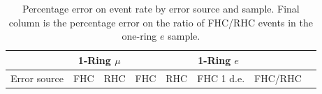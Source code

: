 \begin{table}[H]
	\centering
	\begin{tabular}{|l||l|l||l|l|l|l|l|}
		\hline
		& \multicolumn{2}{c||}{\textbf{1-Ring $\mu$}} & \multicolumn{4}{c|}{\textbf{1-Ring $e$}} \\ \hline
		Error source & FHC & RHC & FHC & RHC & FHC 1 d.e. & FHC/RHC \\ \hline\hline
		
		
		
		
		
		
		
		\hline
		
		
	\end{tabular}
	\caption
	{
	Percentage error on event rate by error source and sample. Final column is the percentage error on the ratio of FHC/RHC events in the one-ring $e$ sample.
	}
	\label{tab:sk_errors_summary}
\end{table}
